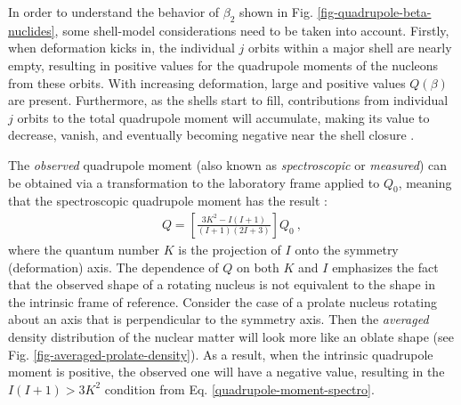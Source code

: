 In order to understand the behavior of $\beta_2$ shown in Fig. \ref{fig-quadrupole-beta-nuclides}, some shell-model considerations need to be taken into account. Firstly, when deformation kicks in, the individual $j$ orbits within a major shell are nearly empty, resulting in positive values for the quadrupole moments of the nucleons from these orbits. With increasing deformation, large and positive values $Q(\beta)$ are present. Furthermore, as the shells start to fill, contributions from individual $j$ orbits to the total quadrupole moment will accumulate, making its value to decrease, vanish, and eventually becoming negative near the shell closure \cite{casten2000nuclear}. %

The \emph{observed} quadrupole moment (also known as \emph{spectroscopic} or \emph{measured}) can be obtained via a transformation to the laboratory frame applied to $Q_0$, meaning that the spectroscopic quadrupole moment has the result \cite{casten2000nuclear}:
\begin{align}
    Q=\left[\frac{3K^2-I(I+1)}{(I+1)(2I+3)}\right]Q_0\ ,
    \label{quadrupole-moment-spectro}
\end{align}
where the quantum number $K$ is the projection of $I$ onto the symmetry (deformation) axis. The dependence of $Q$ on both $K$ and $I$ emphasizes the fact that the observed shape of a rotating nucleus is not equivalent to the shape in the intrinsic frame of reference. Consider the case of a prolate nucleus rotating about an axis that is perpendicular to the symmetry axis. Then the \emph{averaged} density distribution of the nuclear matter will look more like an oblate shape (see Fig. \ref{fig-averaged-prolate-density}). As a result, when the intrinsic quadrupole moment is positive, the observed one will have a negative value, resulting in the $I(I+1)>3K^2$ condition from Eq. \eqref{quadrupole-moment-spectro}.
